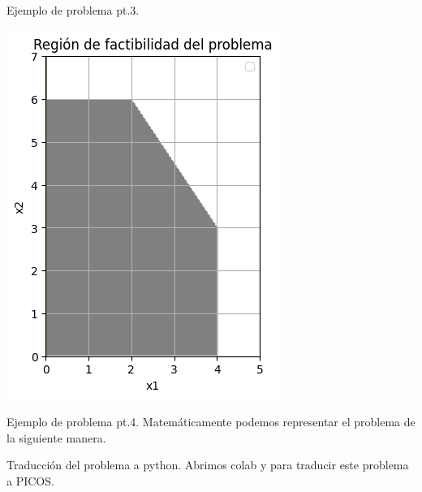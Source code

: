 \documentclass{beamer}
\begin{document}
\begin{frame}[fragile]{Ejemplo de problema pt.3.}
  \begin{center}
      \includegraphics[scale=0.68]{01-factibilidad.png}
  \end{center}
\end{frame}

\begin{frame}[fragile]{Ejemplo de problema pt.4.}
  Matemáticamente podemos representar el problema de la siguiente manera.

\end{frame}
\begin{frame}[fragile]{Traducción del problema a python.}
  Abrimos colab y para traducir este problema a PICOS.
\end{frame}
\end{document}
